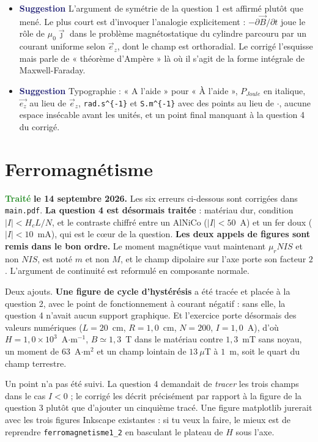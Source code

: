 \documentclass[a4paper,11pt]{article}
\newcommand{\suggestion}{\textcolor{MidnightBlue}{\textbf{Suggestion}}}
\newcommand{\traite}{\textcolor{ForestGreen}{\textbf{Traité}}}
\begin{document}
\begin{itemize}
	travail. Prendre par exemple $a=7$~cm et $b=10$~cm ferait travailler le résultat complet.
	\item \suggestion{} L'argument de symétrie de la question 1 est affirmé plutôt que mené. Le plus
	court est d'invoquer l'analogie explicitement : $-\partial\vec B/\partial t$ joue le rôle de
	$\mu_0\vec\jmath$ dans le problème magnétostatique du cylindre parcouru par un courant uniforme
	selon $\vec e_z$, dont le champ est orthoradial. Le corrigé l'esquisse mais parle de « théorème
	d'Ampère » là où il s'agit de la forme intégrale de Maxwell-Faraday.
	\item \suggestion{} Typographie : « A l'aide » pour « À l'aide », $P_{Joule}$ en italique,
	$\vec{e_z}$ au lieu de $\vec{e}_z$, \texttt{rad.s\textasciicircum\{-1\}} et
	\texttt{S.m\textasciicircum\{-1\}} avec des points au lieu de $\cdot$, aucune espace insécable
	avant les unités, et un point final manquant à la question 4 du corrigé.
\end{itemize}

\section{Ferromagnétisme}

\traite{} \textbf{le 14 septembre 2026.} Les six erreurs ci-dessous sont corrigées dans
\texttt{main.pdf}. \textbf{La question 4 est désormais traitée} : matériau dur, condition
$|I|<H_cL/N$, et le contraste chiffré entre un AlNiCo ($|I|<50$~A) et un fer doux ($|I|<10$~mA), qui
est le c\oe ur de la question. \textbf{Les deux appels de figures sont remis dans le bon ordre.} Le
moment magnétique vaut maintenant $\mu_r NIS$ et non $NIS$, est noté $m$ et non $M$, et le champ
dipolaire sur l'axe porte son facteur $2$. L'argument de continuité est reformulé en composante
normale.

\medskip
Deux ajouts. \textbf{Une figure de cycle d'hystérésis} a été tracée et placée à la question 2, avec
le point de fonctionnement à courant négatif : sans elle, la question 4 n'avait aucun support
graphique. Et l'exercice porte désormais des valeurs numériques ($L=20$~cm, $R=1{,}0$~cm, $N=200$,
$I=1{,}0$~A), d'où $H=1{,}0\times10^{3}$~A$\cdot$m$^{-1}$, $B\simeq1{,}3$~T dans le matériau contre
$1{,}3$~mT sans noyau, un moment de $63$~A$\cdot$m$^{2}$ et un champ lointain de $13~\mu$T à $1$~m,
soit le quart du champ terrestre.

\medskip
Un point n'a pas été suivi. La question 4 demandait de \textit{tracer} les trois champs dans le cas
$I<0$ ; le corrigé les décrit précisément par rapport à la figure de la question 3 plutôt que d'ajouter
un cinquième tracé. Une figure matplotlib jurerait avec les trois figures Inkscape existantes : si tu
veux la faire, le mieux est de reprendre \texttt{ferromagnetisme1\_2} en basculant le plateau de $H$
sous l'axe.
\end{document}
